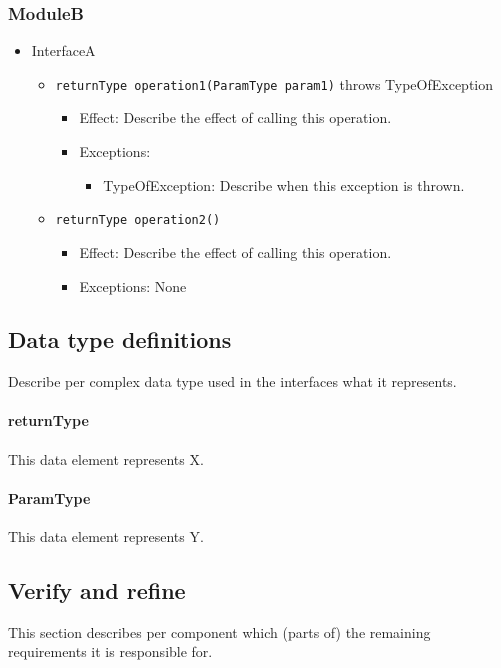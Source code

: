 \documentclass[english]{sareport}
\begin{document}
\subsubsection*{ModuleB}
\begin{itemize}
	\item InterfaceA
	\begin{itemize}
		\item \texttt{returnType operation1(ParamType param1)} throws TypeOfException
		\begin{itemize}
			\item Effect: Describe the effect of calling this operation.
			\item Exceptions:
			\begin{itemize}
				\item TypeOfException: Describe when this exception is thrown.
			\end{itemize}
		\end{itemize}

		\item \texttt{returnType operation2()}
		\begin{itemize}
			\item Effect: Describe the effect of calling this operation.
			\item Exceptions: None
		\end{itemize}
	\end{itemize}
\end{itemize}

\subsection{Data type definitions}
Describe per complex data type used in the interfaces what it represents.

\paragraph{returnType} This data element represents X.

\paragraph{ParamType} This data element represents Y.

\subsection{Verify and refine}
This section describes per component which (parts of) the remaining
requirements it is responsible for.
\end{document}
